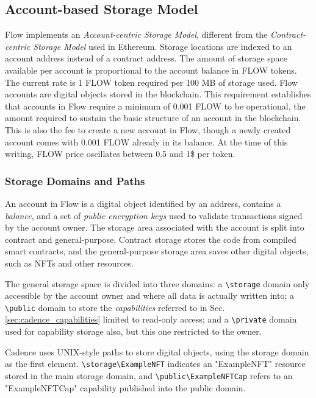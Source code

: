 \documentclass[../NFTComp_IEEE.tex]{subfiles}
\begin{document}
\subsection{Account-based Storage Model}
Flow implements an \textit{Account-centric Storage Model}, different from the \textit{Contract-centric Storage Model} used in Ethereum. Storage locations are indexed to an account address instead of a contract address. The amount of storage space available per account is proportional to the account balance in FLOW tokens. The current rate is 1 FLOW token required per 100 MB of storage used. Flow accounts are digital objects stored in the blockchain. This requirement establishes that accounts in Flow require a minimum of 0.001 FLOW to be operational, the amount required to sustain the basic structure of an account in the blockchain. This is also the fee to create a new account in Flow, though a newly created account comes with 0.001 FLOW already in its balance. At the time of this writing, FLOW price oscillates between 0.5 and 1\$ per token.

\subsubsection{Storage Domains and Paths}
\label{sec:cadence_storage_domain}
An account in Flow is a digital object identified by an address, contains a \textit{balance}, and a set of \textit{public encryption keys} used to validate transactions signed by the account owner. The storage area associated with the account is split into contract and general-purpose. Contract storage stores the code from compiled smart contracts, and the general-purpose storage area saves other digital objects, such as NFTs and other resources.
\par
The general storage space is divided into three domains: a \verb|\storage| domain only accessible by the account owner and where all data is actually written into; a \verb|\public| domain to store the \textit{capabilities} referred to in Sec. \ref{sec:cadence_capabilities} limited to read-only access; and a \verb|\private| domain used for capability storage also, but this one restricted to the owner.
\par
Cadence uses UNIX-style paths to store digital objects, using the storage domain as the first element. \verb|\storage\ExampleNFT| indicates an "ExampleNFT" resource stored in the main storage domain, and \verb|\public\ExampleNFTCap| refers to an "ExampleNFTCap" capability published into the public domain.
\end{document}
